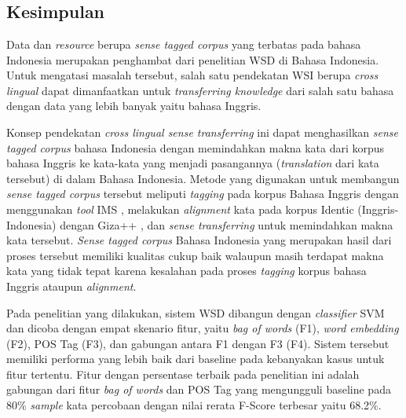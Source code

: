 \chapter{\babEnam}

\section{Kesimpulan}

Data dan \textit{resource} berupa \textit{sense tagged corpus} yang terbatas pada bahasa Indonesia merupakan penghambat dari penelitian WSD di Bahasa Indonesia. Untuk mengatasi masalah tersebut, salah satu pendekatan WSI berupa \textit{cross lingual} dapat dimanfaatkan untuk \textit{transferring knowledge} dari salah satu bahasa dengan data yang lebih banyak yaitu bahasa Inggris.

Konsep pendekatan \textit{cross lingual sense transferring} ini dapat menghasilkan \textit{sense tagged corpus} bahasa Indonesia dengan memindahkan makna kata dari korpus bahasa Inggris ke kata-kata yang menjadi pasangannya (\textit{translation} dari kata tersebut) di dalam Bahasa Indonesia. Metode yang digunakan untuk membangun \textit{sense tagged corpus} tersebut meliputi \textit{tagging} pada korpus Bahasa Inggris dengan menggunakan \textit{tool} IMS \citep{zhong2010makes}, melakukan \textit{alignment} kata pada korpus Identic (Inggris-Indonesia) dengan Giza++ \citep{och03:asc}, dan \textit{sense transferring} untuk memindahkan makna kata tersebut. \textit{Sense tagged corpus} Bahasa Indonesia  yang merupakan hasil dari proses tersebut memiliki kualitas cukup baik walaupun masih terdapat makna kata yang tidak tepat karena kesalahan pada proses \textit{tagging} korpus bahasa Inggris ataupun \textit{alignment}.

Pada penelitian yang dilakukan, sistem WSD dibangun dengan \textit{classifier} SVM dan dicoba dengan empat skenario fitur, yaitu \textit{bag of words} (F1), \textit{word embedding} (F2), POS Tag (F3), dan gabungan antara F1 dengan F3 (F4). Sistem tersebut  memiliki performa yang lebih baik dari baseline pada kebanyakan kasus untuk fitur tertentu. Fitur dengan persentase terbaik pada penelitian ini adalah gabungan dari fitur \textit{bag of words} dan POS Tag yang mengungguli baseline pada 80\% \textit{sample} kata percobaan dengan nilai rerata F-Score terbesar yaitu 68.2\%.
